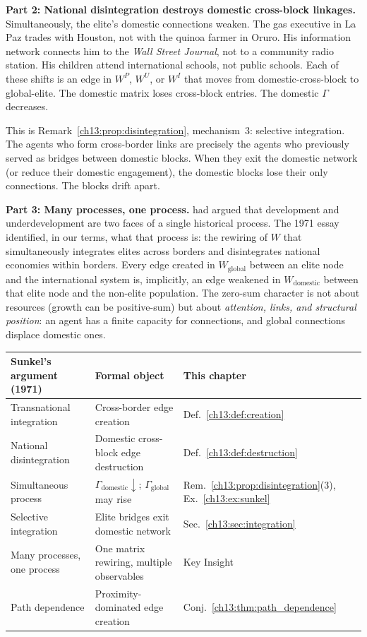 \documentclass[../structural_economics_book.tex]{subfiles}
\begin{document}
\textbf{Part 2: National disintegration destroys domestic cross-block linkages.} Simultaneously, the elite's domestic connections weaken. The gas executive in La Paz trades with Houston, not with the quinoa farmer in Oruro. His information network connects him to the \textit{Wall Street Journal}, not to a community radio station. His children attend international schools, not public schools. Each of these shifts is an edge in $W^P$, $W^U$, or $W^I$ that moves from domestic-cross-block to global-elite. The domestic matrix loses cross-block entries. The domestic $\Gamma$ decreases.

This is Remark~\ref{ch13:prop:disintegration}, mechanism~3: selective integration. The agents who form cross-border links are precisely the agents who previously served as bridges between domestic blocks. When they exit the domestic network (or reduce their domestic engagement), the domestic blocks lose their only connections. The blocks drift apart.

\textbf{Part 3: Many processes, one process.} \citet{sunkel1970subdesarrollo} had argued that development and underdevelopment are two faces of a single historical process. The 1971 essay identified, in our terms, what that process is: the rewiring of $W$ that simultaneously integrates elites across borders and disintegrates national economies within borders. Every edge created in $W_{\text{global}}$ between an elite node and the international system is, implicitly, an edge weakened in $W_{\text{domestic}}$ between that elite node and the non-elite population. The zero-sum character is not about resources (growth can be positive-sum) but about \textit{attention, links, and structural position}: an agent has a finite capacity for connections, and global connections displace domestic ones.

\begin{center}
\begin{tabularx}{\textwidth}{LLL}
\toprule
\textbf{Sunkel's argument (1971)} & \textbf{Formal object} & \textbf{This chapter} \\
\midrule
Transnational integration & Cross-border edge creation & Def.~\ref{ch13:def:creation} \\
National disintegration & Domestic cross-block edge destruction & Def.~\ref{ch13:def:destruction} \\
Simultaneous process & $\Gamma_{\text{domestic}} \downarrow$; $\Gamma_{\text{global}}$ may rise & Rem.~\ref{ch13:prop:disintegration}(3), Ex.~\ref{ch13:ex:sunkel} \\
Selective integration & Elite bridges exit domestic network & Sec.~\ref{ch13:sec:integration} \\
Many processes, one process & One matrix rewiring, multiple observables & Key Insight \\
Path dependence & Proximity-dominated edge creation & Conj.~\ref{ch13:thm:path_dependence} \\
\bottomrule
\end{tabularx}
\end{center}
\end{document}
